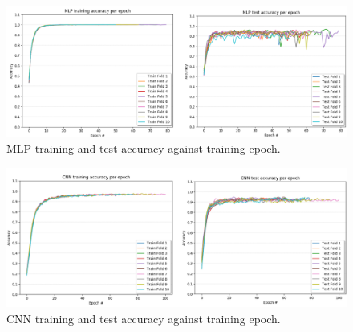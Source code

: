 \begin{figure}[H]
  \centering
  \centerline{\includegraphics[scale=0.55]{Images/mlp_train_test.png}}
  \caption{MLP training and test accuracy against training epoch.}
  \label{cnn_train_test}
\end{figure}

\begin{figure}[H]
  \centering
  \centerline{\includegraphics[scale=0.55]{Images/cnn_train_test.png}}
  \caption{CNN training and test accuracy against training epoch.}
  \label{mlp_train_test}
\end{figure}




